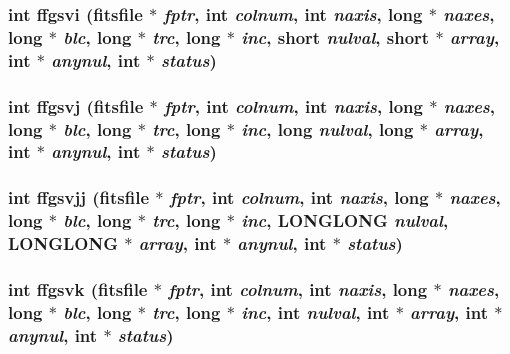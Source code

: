 \subsubsection{\setlength{\rightskip}{0pt plus 5cm}int ffgsvi (\bf{fitsfile} $\ast$ {\em fptr}, int {\em colnum}, int {\em naxis}, long $\ast$ {\em naxes}, long $\ast$ {\em blc}, long $\ast$ {\em trc}, long $\ast$ {\em inc}, short {\em nulval}, short $\ast$ {\em array}, int $\ast$ {\em anynul}, int $\ast$ {\em status})}\label{fitsio_8h_f6fc8403f2e424f4940ccbb2ef1f13c5}


\subsubsection{\setlength{\rightskip}{0pt plus 5cm}int ffgsvj (\bf{fitsfile} $\ast$ {\em fptr}, int {\em colnum}, int {\em naxis}, long $\ast$ {\em naxes}, long $\ast$ {\em blc}, long $\ast$ {\em trc}, long $\ast$ {\em inc}, long {\em nulval}, long $\ast$ {\em array}, int $\ast$ {\em anynul}, int $\ast$ {\em status})}\label{fitsio_8h_4dab3a6e95489f607d0e69dc0c5b0de2}


\subsubsection{\setlength{\rightskip}{0pt plus 5cm}int ffgsvjj (\bf{fitsfile} $\ast$ {\em fptr}, int {\em colnum}, int {\em naxis}, long $\ast$ {\em naxes}, long $\ast$ {\em blc}, long $\ast$ {\em trc}, long $\ast$ {\em inc}, \bf{LONGLONG} {\em nulval}, \bf{LONGLONG} $\ast$ {\em array}, int $\ast$ {\em anynul}, int $\ast$ {\em status})}\label{fitsio_8h_b11dce310951c2540223e1e021e4257d}


\subsubsection{\setlength{\rightskip}{0pt plus 5cm}int ffgsvk (\bf{fitsfile} $\ast$ {\em fptr}, int {\em colnum}, int {\em naxis}, long $\ast$ {\em naxes}, long $\ast$ {\em blc}, long $\ast$ {\em trc}, long $\ast$ {\em inc}, int {\em nulval}, int $\ast$ {\em array}, int $\ast$ {\em anynul}, int $\ast$ {\em status})}\label{fitsio_8h_af5457b13c2e0db0be99a6dd61c025dc}


